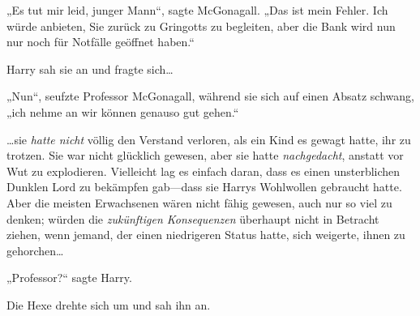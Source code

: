 „Es tut mir leid, junger Mann“, sagte McGonagall. „Das ist mein Fehler. Ich würde anbieten, Sie zurück zu Gringotts zu begleiten, aber die Bank wird nun nur noch für Notfälle geöffnet haben.“

Harry sah sie an und fragte sich…

„Nun“, seufzte Professor McGonagall, während sie sich auf einen Absatz schwang, „ich nehme an wir können genauso gut gehen.“

…sie \emph{hatte nicht} völlig den Verstand verloren, als ein Kind es gewagt hatte, ihr zu trotzen. Sie war nicht glücklich gewesen, aber sie hatte \emph{nachgedacht}, anstatt vor Wut zu explodieren. Vielleicht lag es einfach daran, dass es einen unsterblichen Dunklen Lord zu bekämpfen gab—dass sie Harrys Wohlwollen gebraucht hatte. Aber die meisten Erwachsenen wären nicht fähig gewesen, auch nur so viel zu denken; würden die \emph{zukünftigen Konsequenzen} überhaupt nicht in Betracht ziehen, wenn jemand, der einen niedrigeren Status hatte, sich weigerte, ihnen zu gehorchen…

„Professor?“ sagte Harry.

Die Hexe drehte sich um und sah ihn an.

